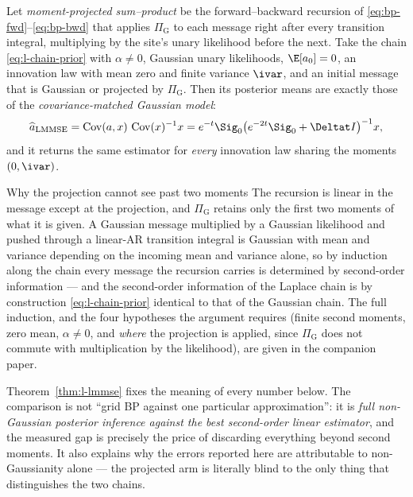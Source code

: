 \begin{theorem}
\label{thm:l-lmmse}
Let \emph{moment-projected sum--product} be the forward--backward recursion
of \eqref{eq:bp-fwd}--\eqref{eq:bp-bwd} that applies $\Pi_{\mathrm{G}}$ to each
message right after every transition integral, multiplying by the site's unary
likelihood before the next. Take the chain \eqref{eq:l-chain-prior} with
$\alpha \neq 0$, Gaussian unary likelihoods, $\E[a_0] = 0$, an innovation law
with mean zero and finite variance $\ivar$, and an initial message that is Gaussian
or projected by $\Pi_{\mathrm{G}}$. Then its posterior means are exactly those
of the \emph{covariance-matched Gaussian model}:
\begin{equation}
  \widehat{a}_{\mathrm{LMMSE}}
  = \operatorname{Cov}(a,x)\,\operatorname{Cov}(x)^{-1} x
  = e^{-t}\Sig_0\big(e^{-2t}\Sig_0 + \Deltat I\big)^{-1} x ,
  \label{eq:l-lmmse}
\end{equation}
and it returns the same estimator for \emph{every} innovation law sharing the
moments $(0, \ivar)$.
\end{theorem}

\begin{toolbox}{Why the projection cannot see past two moments}
The recursion is linear in the message except at the projection, and
$\Pi_{\mathrm{G}}$ retains only the first two moments of what it is given. A
Gaussian message multiplied by a Gaussian likelihood and pushed through a
linear-AR transition integral is Gaussian with mean and variance depending on
the incoming mean and variance alone, so by induction along the chain every
message the recursion carries is determined by second-order information ---
and the second-order information of the Laplace chain is by construction
\eqref{eq:l-chain-prior} identical to that of the Gaussian chain. The full
induction, and the four hypotheses the argument requires (finite second
moments, zero mean, $\alpha \neq 0$, and \emph{where} the projection is
applied, since $\Pi_{\mathrm{G}}$ does not commute with multiplication by the
likelihood), are given in the companion paper.
\end{toolbox}

Theorem~\ref{thm:l-lmmse} fixes the meaning of every number below. The
comparison is not ``grid BP against one particular approximation'': it is
\emph{full non-Gaussian posterior inference against the best second-order
linear estimator}, and the measured gap is precisely the price of discarding
everything beyond second moments. It also explains why the errors reported
here are attributable to non-Gaussianity alone --- the projected arm is
literally blind to the only thing that distinguishes the two chains.

